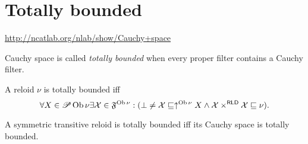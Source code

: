 \section{Totally bounded}

\url{http://ncatlab.org/nlab/show/Cauchy+space}

\begin{defn}
  Cauchy space is called \emph{totally bounded} when every proper filter
  contains a Cauchy filter. 
\end{defn}

\begin{obvious}
A reloid $\nu$ is totally bounded iff
\[ \forall X \in \mathscr{P} \operatorname{Ob} \nu \exists \mathcal{X} \in
   \mathfrak{F}^{\operatorname{Ob} \nu} : (\bot \neq \mathcal{X} \sqsubseteq
   \uparrow^{\operatorname{Ob} \nu} X \wedge \mathcal{X} \times^{\mathsf{RLD}}
   \mathcal{X} \sqsubseteq \nu) . \]
\end{obvious}

\begin{thm}
  A symmetric transitive reloid is totally bounded iff its Cauchy space is
  totally bounded.
\end{thm}

